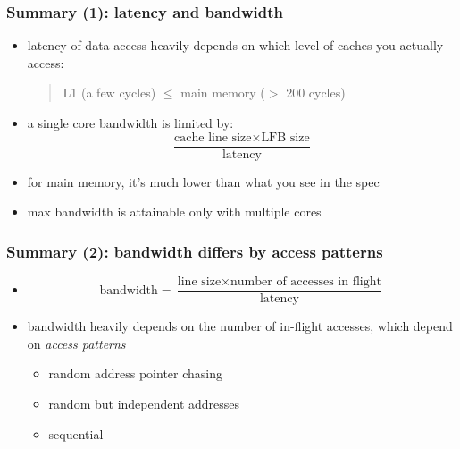 \documentclass[12pt,dvipdfmx]{beamer}
\newcommand{\ao}[1]{{\color{blue}#1}}
\begin{document}
\begin{frame}
\frametitle{Summary (1): latency and bandwidth}

\begin{itemize}
\item \ao{latency} of data access heavily depends on which level of caches 
  you actually access:
  \begin{quote}
 L1 (a few cycles) $\leq$ main memory ($>$ 200 cycles)
  \end{quote}

\item a single core bandwidth is limited by:
\[ \frac{\mbox{cache line size} \times \mbox{LFB size}}{\mbox{latency}} \]

\item for main memory, it's much lower than what you see in the spec

\item max bandwidth is attainable only with multiple cores
\end{itemize}
\end{frame}


\begin{frame}
\frametitle{Summary (2): bandwidth differs by access patterns}
\begin{itemize}
\item 
\[ \mbox{bandwidth} = \frac{\mbox{line size} \times 
  \mbox{number of accesses in flight}}{\mbox{latency}} \]

\item \ao{bandwidth} heavily depends on the number of in-flight accesses,
  which depend on \ao{\emph{access patterns}}
  \begin{itemize}
  \item random address pointer chasing
  \item random but independent addresses
  \item sequential
  \end{itemize}
\end{itemize}
\end{frame}
\end{document}
